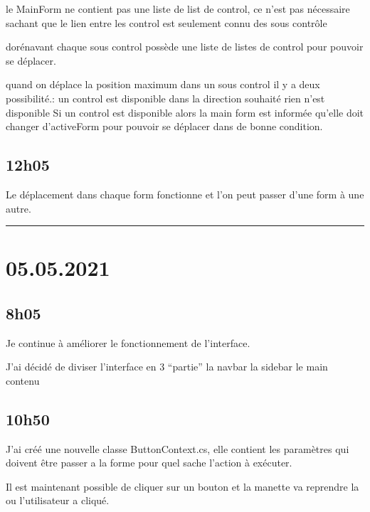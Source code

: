 \documentclass[a4paper,12pt,french]{sphinxmanual}
\begin{document}
\sphinxAtStartPar
le MainForm ne contient pas une liste de list de control, ce n’est pas nécessaire sachant que le lien entre les control est seulement connu des sous contrôle

\sphinxAtStartPar
dorénavant chaque sous control possède une liste de listes de control pour pouvoir se déplacer.

\sphinxAtStartPar
quand on déplace la position maximum dans un sous control il y a deux possibilité.:
un control est disponible dans la direction souhaité
rien n’est disponible
Si un control est disponible alors la main form est informée qu’elle doit changer d’activeForm pour pouvoir se déplacer dans de bonne condition.


\subsection{12h05}
\label{\detokenize{logbook:id69}}
\sphinxAtStartPar
Le déplacement dans chaque form fonctionne et l’on peut passer d’une form à une autre.


\bigskip\hrule\bigskip



\section{05.05.2021}
\label{\detokenize{logbook:id70}}

\subsection{8h05}
\label{\detokenize{logbook:id71}}
\sphinxAtStartPar
Je continue à améliorer le fonctionnement de l’interface.

\sphinxAtStartPar
J’ai décidé de diviser l’interface en 3 “partie”
la navbar
la sidebar
le main contenu

\sphinxAtStartPar
{}


\subsection{10h50}
\label{\detokenize{logbook:id72}}
\sphinxAtStartPar
J’ai créé une nouvelle classe ButtonContext.cs, elle contient les paramètres qui doivent être passer a la forme pour quel sache l’action à exécuter.

\sphinxAtStartPar
Il est maintenant possible de cliquer sur un bouton et la manette va reprendre la ou l’utilisateur a cliqué.
\end{document}
